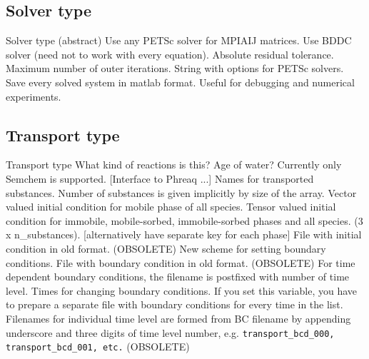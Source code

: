 \documentclass[12pt,a4paper]{report}
\begin{document}
\subsection{Solver type}
\begin{recordtype}{Solver type}{ (abstract)}
  Use any PETSc solver for MPIAIJ matrices.
  Use BDDC solver (need not to work with every equation).
 Absolute residual tolerance. 
 Maximum number of outer iterations.
 String with options for PETSc solvers.
 Save every solved system in matlab format. Useful for debugging and numerical experiments.
\end{recordtype}


\subsection{Transport type}
\begin{recordtype}{Transport type}{}
 What kind of reactions is this? Age of water?
 Currently only Semchem is supported. [Interface to Phreaq ...]
 Names for transported substances. Number of substances is given implicitly by size of the array.
 Vector valued initial condition for mobile phase of all species. 
 Tensor valued initial condition for immobile, mobile-sorbed, immobile-sorbed phases and all species. (3 x n\_substances).
 [alternatively have separate key for each phase]
 File with initial condition in old format. (OBSOLETE)
 New scheme for setting boundary conditions.
 File with boundary condition in old format. (OBSOLETE)
 For time dependent boundary conditions, the filename is postfixed with 
 number of time level.
  Times for changing boundary conditions. If you set this variable, you have to prepare a separate file with boundary conditions for every 
  time in the list. Filenames for individual time level are formed from BC filename by appending underscore and three digits of time level number, e.g. 
  {\tt transport\_bcd\_000, transport\_bcd\_001, etc.} (OBSOLETE)

\end{recordtype}
\end{document}
